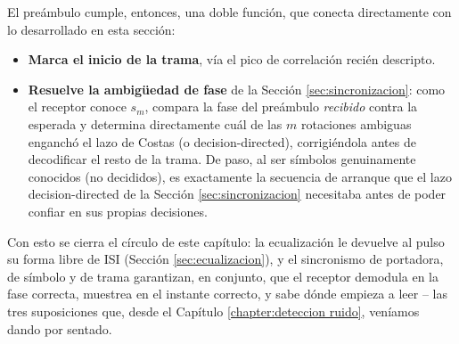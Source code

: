 El preámbulo cumple, entonces, una doble función, que conecta directamente con lo desarrollado en esta sección:
\begin{itemize}
    \item \textbf{Marca el inicio de la trama}, vía el pico de correlación recién descripto.
    \item \textbf{Resuelve la ambigüedad de fase} de la Sección \ref{sec:sincronizacion}: como el receptor conoce $s_m$, compara la fase del preámbulo \emph{recibido} contra la esperada y determina directamente cuál de las $m$ rotaciones ambiguas enganchó el lazo de Costas (o decision-directed), corrigiéndola antes de decodificar el resto de la trama. De paso, al ser símbolos genuinamente conocidos (no decididos), es exactamente la secuencia de arranque que el lazo decision-directed de la Sección \ref{sec:sincronizacion} necesitaba antes de poder confiar en sus propias decisiones.
\end{itemize}

Con esto se cierra el círculo de este capítulo: la ecualización le devuelve al pulso su forma libre de ISI (Sección \ref{sec:ecualizacion}), y el sincronismo de portadora, de símbolo y de trama garantizan, en conjunto, que el receptor demodula en la fase correcta, muestrea en el instante correcto, y sabe dónde empieza a leer -- las tres suposiciones que, desde el Capítulo \ref{chapter:deteccion ruido}, veníamos dando por sentado.




